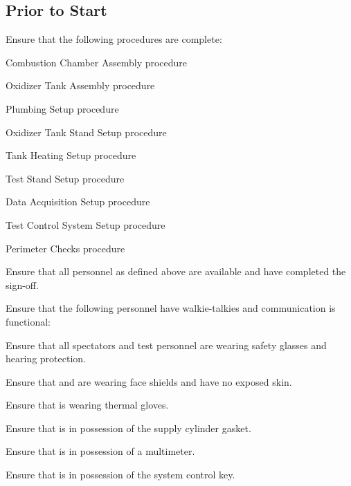 \subsection{Prior to Start}
\begin{checklist}
    \item Ensure that the following procedures are complete:
    \begin{checklist}
        \item Combustion Chamber Assembly procedure
        \item Oxidizer Tank Assembly procedure
        \item Plumbing Setup procedure
        \item Oxidizer Tank Stand Setup procedure
        \item Tank Heating Setup procedure
        \item Test Stand Setup procedure
        \item Data Acquisition Setup procedure
        \item Test Control System Setup procedure
        \item Perimeter Checks procedure
    \end{checklist}
    \item Ensure that all personnel as defined above are available and have completed the sign-off.
    \item Ensure that the following personnel have walkie-talkies and communication is functional:
    \begin{checklist}
        \item \ops{}
        \item \secondary{}
        \item \daq{}
        \item \peri{}
        \item \perii{}
        \item \periii{}
        \item \periv{}
    \end{checklist}
    \item Ensure that all spectators and test personnel are wearing safety glasses and hearing protection.
    \item Ensure that \primary{} and \secondary{} are wearing face shields and have no exposed skin.
    \item Ensure that \primary{} is wearing thermal gloves.
    \item Ensure that \primary{} is in possession of the supply cylinder gasket. 
    \item Ensure that \secondary{} is in possession of a multimeter.
    \item Ensure that \ops{} is in possession of the system control key.
\end{checklist}
\setcounter{checklistnum}{0}

